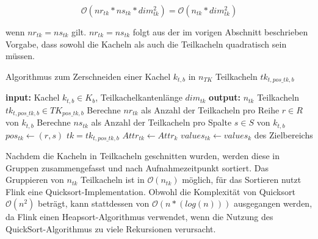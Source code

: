 \begin{equation} \label{eq:complexityCut}
\mathcal{O}(nr_{tk} * ns_{tk} * dim_{tk}^2) = \mathcal{O}(n_{tk} * dim_{tk}^2)
\end{equation}

wenn $nr_{tk} = ns_{tk}$ gilt. $nr_{tk} = ns_{tk}$ folgt aus der im vorigen Abschnitt beschrieben Vorgabe, dass sowohl die Kacheln als auch die Teilkacheln quadratisch sein müssen. 

\begin{algorithm}[H]
\small
\caption{Algorithmus zum Zerschneiden einer Kachel $k_{t, b}$ in $n_{TK}$ Teilkacheln $tk_{t, pos\_tk, b}$}
\label{alg:cutAlgorithm}
\begin{algorithmic}[1]
	\State \textbf{input:} Kachel $k_{t, b} \in K_{b}$, Teilkachelkantenlänge $dim_{tk}$ 
	\State \textbf{output:} $n_{tk}$ Teilkacheln $tk_{t, pos\_tk, b} \in TK_{pos\_tk, b}$
	\State Berechne $nr_{tk}$ als Anzahl der Teilkacheln pro Reihe $r \in R$ von $k_{t, b}$  \label{alg:calcNR}
	\State Berechne $ns_{tk}$ als Anzahl der Teilkacheln pro Spalte $s \in S$ von $k_{t, b}$  \label{alg:calcNS}
	  \label{alg:iterR}
        		  \label{alg:iterS}
			\State $pos_{tk} \leftarrow (r, s)$  \label{alg:setAttributes}
			\State $tk = tk_{t, pos\_tk, b}$ 
        			\State $Attr_{tk} \leftarrow Attr_{k}$ 
			   \label{alg:computeS16}
				\State $values_{tk} \leftarrow values_k$ des Zielbereichs 
			\EndFor
		\EndFor
		 
	\EndFor
\EndFunction
\end{algorithmic}
\end{algorithm}

Nachdem die Kacheln in Teilkacheln geschnitten wurden, werden diese in Gruppen zusammengefasst und nach Aufnahmezeitpunkt sortiert. Das Gruppieren von $n_{tk}$ Teilkacheln ist in $\mathcal{O}(n_{tk})$ möglich, für das Sortieren nutzt Flink eine Quicksort-Implementation. Obwohl die Komplexität von Quicksort $\mathcal{O}(n^2)$ beträgt, kann stattdessen von $\mathcal{O}(n*(log(n)))$ ausgegangen werden, da Flink einen Heapsort-Algorithmus verwendet, wenn die Nutzung des QuickSort-Algorithmus zu viele Rekursionen verursacht. 

